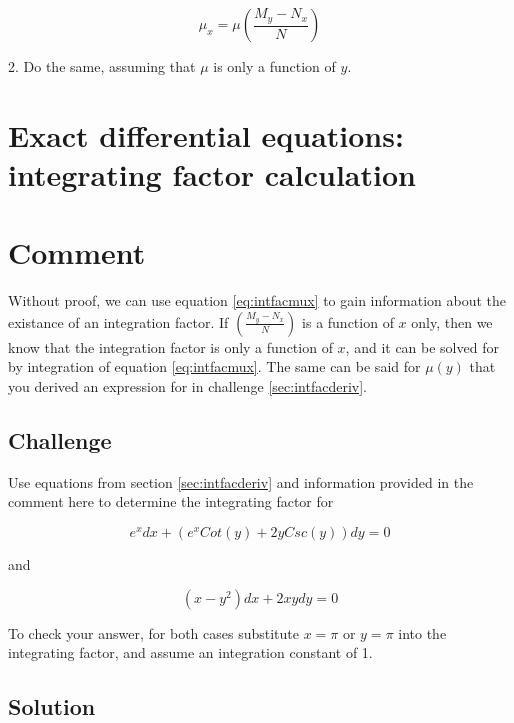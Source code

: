 \begin{equation}
    \label{eq:intfacmux}
    \mu_x = \mu \left ( \frac{M_y-N_x}{N} \right )
\end{equation}

2. Do the same, assuming that $\mu$ is only a function of $y$.


\timebox




\newpage
\section{Exact differential equations: integrating factor calculation}
\label{sec:edeifcalc}

\section*{Comment}
Without proof, we can use equation \ref{eq:intfacmux} to gain information about the existance of an integration factor. If $\left ( \frac{M_y-N_x}{N} \right )$ is a function of $x$ only, then we know that the integration factor is only a function of $x$, and it can be solved for by integration of equation \ref{eq:intfacmux}. The same can be said for $\mu(y)$ that you derived an expression for in challenge \ref{sec:intfacderiv}.

\subsection*{Challenge}
Use equations from section \ref{sec:intfacderiv} and information provided in the comment here to determine the integrating factor for

\begin{equation}
    \label{eq:edeifcalc1}
    e^x dx + (e^x Cot(y) + 2y Csc(y)) dy = 0
\end{equation}

and

\begin{equation}
    \label{eq:edeifcalc2}
    (x-y^2) dx + 2xy dy = 0
\end{equation}

To check your answer, for both cases substitute $x=\pi$ or $y=\pi$ into the integrating factor, and assume an integration constant of 1.

\subsection*{Solution}


